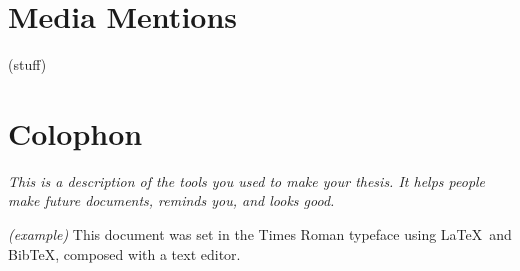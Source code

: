 



\appendix

\chapter{Media Mentions}
\label{appendixlabel1}
(stuff)


\chapter{Colophon}
\label{appendixlabel3}
\textit{This is a description of the tools you used to make your thesis. It helps people make future documents, reminds you, and looks good.}

\textit{(example)} This document was set in the Times Roman typeface using \LaTeX\ and Bib\TeX , composed with a text editor. 

